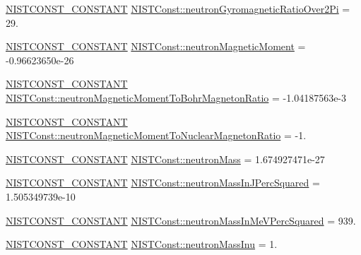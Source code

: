 \begin{DoxyCompactItemize}
\mbox{\hyperlink{_n_i_s_t_const_8hpp_a2b0fc1d7452373f816175dd86ce26729}{N\+I\+S\+T\+C\+O\+N\+S\+T\+\_\+\+C\+O\+N\+S\+T\+A\+NT}} \mbox{\hyperlink{group___n_i_s_t_const-_neutron_gaadb23cc5d8146b6a47bcfe0798e51674}{N\+I\+S\+T\+Const\+::neutron\+Gyromagnetic\+Ratio\+Over2\+Pi}} = 29.
\item 
\mbox{\hyperlink{_n_i_s_t_const_8hpp_a2b0fc1d7452373f816175dd86ce26729}{N\+I\+S\+T\+C\+O\+N\+S\+T\+\_\+\+C\+O\+N\+S\+T\+A\+NT}} \mbox{\hyperlink{group___n_i_s_t_const-_neutron_gab5d1be65ba0e6d7851bad31495663148}{N\+I\+S\+T\+Const\+::neutron\+Magnetic\+Moment}} = -\/0.\+96623650e-\/26
\item 
\mbox{\hyperlink{_n_i_s_t_const_8hpp_a2b0fc1d7452373f816175dd86ce26729}{N\+I\+S\+T\+C\+O\+N\+S\+T\+\_\+\+C\+O\+N\+S\+T\+A\+NT}} \mbox{\hyperlink{group___n_i_s_t_const-_neutron_gab8bdbec377228e9e15b00ca4d0a0a3c0}{N\+I\+S\+T\+Const\+::neutron\+Magnetic\+Moment\+To\+Bohr\+Magneton\+Ratio}} = -\/1.\+04187563e-\/3
\item 
\mbox{\hyperlink{_n_i_s_t_const_8hpp_a2b0fc1d7452373f816175dd86ce26729}{N\+I\+S\+T\+C\+O\+N\+S\+T\+\_\+\+C\+O\+N\+S\+T\+A\+NT}} \mbox{\hyperlink{group___n_i_s_t_const-_neutron_ga37a4e076d3bfff8197cbd9cdebd2daef}{N\+I\+S\+T\+Const\+::neutron\+Magnetic\+Moment\+To\+Nuclear\+Magneton\+Ratio}} = -\/1.
\item 
\mbox{\hyperlink{_n_i_s_t_const_8hpp_a2b0fc1d7452373f816175dd86ce26729}{N\+I\+S\+T\+C\+O\+N\+S\+T\+\_\+\+C\+O\+N\+S\+T\+A\+NT}} \mbox{\hyperlink{group___n_i_s_t_const-_neutron_gaff4987a18b550937fb56b37afd74f550}{N\+I\+S\+T\+Const\+::neutron\+Mass}} = 1.\+674927471e-\/27
\item 
\mbox{\hyperlink{_n_i_s_t_const_8hpp_a2b0fc1d7452373f816175dd86ce26729}{N\+I\+S\+T\+C\+O\+N\+S\+T\+\_\+\+C\+O\+N\+S\+T\+A\+NT}} \mbox{\hyperlink{group___n_i_s_t_const-_neutron_ga15810e363506746df03012432e2a357d}{N\+I\+S\+T\+Const\+::neutron\+Mass\+In\+J\+Perc\+Squared}} = 1.\+505349739e-\/10
\item 
\mbox{\hyperlink{_n_i_s_t_const_8hpp_a2b0fc1d7452373f816175dd86ce26729}{N\+I\+S\+T\+C\+O\+N\+S\+T\+\_\+\+C\+O\+N\+S\+T\+A\+NT}} \mbox{\hyperlink{group___n_i_s_t_const-_neutron_ga297e6f2449995461e549326eaa3c8abc}{N\+I\+S\+T\+Const\+::neutron\+Mass\+In\+Me\+V\+Perc\+Squared}} = 939.
\item 
\mbox{\hyperlink{_n_i_s_t_const_8hpp_a2b0fc1d7452373f816175dd86ce26729}{N\+I\+S\+T\+C\+O\+N\+S\+T\+\_\+\+C\+O\+N\+S\+T\+A\+NT}} \mbox{\hyperlink{group___n_i_s_t_const-_neutron_ga60a98d26ad8fd6d4cf7e95a9335fabd3}{N\+I\+S\+T\+Const\+::neutron\+Mass\+Inu}} = 1.

\end{DoxyCompactItemize}
